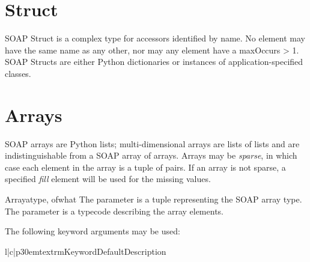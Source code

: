 \section{Struct}

SOAP Struct is a complex type for accessors identified by name. No element may 
have the same name as any other, nor may any element have a maxOccurs > 1. 
SOAP Structs are either Python dictionaries or instances of application-specified classes.

\section{Arrays}

SOAP arrays are Python lists; multi-dimensional arrays are
lists of lists and are indistinguishable from a SOAP array of arrays.
Arrays may be \emph{sparse}, in which case each element in the
array is a tuple of  pairs.
If an array is not sparse, a specified \emph{fill} element will be
used for the missing values.


\begin{classdesc}{Array}{atype, ofwhat}
The  parameter is a  tuple representing the SOAP
array type. The  parameter is a typecode describing the array elements.
\end{classdesc}

The following keyword arguments may be used:

\begin{tableiii}{l|c|p{30em}}{textrm}{Keyword}{Default}{Description}
\end{tableiii}

